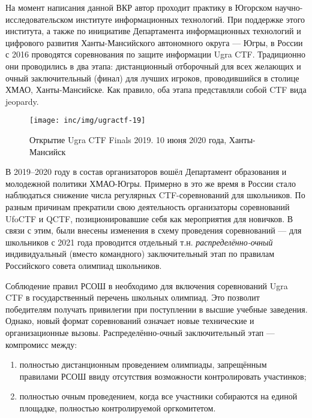На момент написания данной ВКР автор проходит практику в Югорском научно-исследовательском институте информационных технологий. При поддержке этого института, а также по инициативе Департамента информационных технологий и цифрового развития Ханты-Мансийского автономного округа — Югры, в России с 2016 проводятся соревнования по защите информации Ugra CTF. Традиционно они проводились в два этапа: дистанционный отборочный для всех желающих и очный заключительный (финал) для лучших игроков, проводившийся в столице ХМАО, Ханты-Мансийске. Как правило, оба этапа представляли собой CTF вида jeopardy.

\begin{figure}
  \centering
  \texttt{[image: inc/img/ugractf-19]}
  \caption{Открытие Ugra CTF Finals 2019. 10 июня 2020 года, Ханты-Мансийск}
  \label{fig:ugractf-19}
\end{figure}


В 2019–2020 году в состав организаторов вошёл Департамент образования и молодежной политики ХМАО-Югры. Примерно в это же время в России стало наблюдаться снижение числа регулярных CTF-соревнований для школьников. По разным причинам прекратили свою деятельность организаторы соревнований UfoCTF\cite{UfoCTF} и QCTF\cite{QCTF}, позиционировавшие себя как мероприятия для новичков. В связи с этим, были внесены изменения в схему проведения соревнований — для школьников с 2021 года проводится отдельный т.н. \textit{распределённо-очный} индивидуальный (вместо командного) заключительный этап по правилам Российского совета олимпиад школьников.


Соблюдение правил РСОШ в необходимо для включения соревнований Ugra CTF в государственный перечень школьных олимпиад. Это позволит победителям получать привилегии при поступлении в высшие учебные заведения. Однако, новый формат соревнований означает новые технические и организационные вызовы. Распределённо-очный заключительный этап --- компромисс между:
\begin{enumerate}
  \item полностью дистанционным проведением олимпиады, запрещённым правилами РСОШ ввиду отсутствия возможности контролировать участинков;
  \item полностью очным проведением, когда все участники собираются на единой площадке, полностью контролируемой оргкомитетом.
\end{enumerate}

